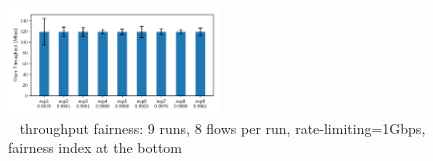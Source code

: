 \begin{figure}[!t]
\centering
\includegraphics[width=0.5\textwidth]{rate_limiter/raw_data/spring_fairness/figure.pdf}
\caption{~\spring{} throughput fairness: 9 runs, 8 flows per run, rate-limiting=1Gbps, fairness index at the bottom}
\label{fig:spring:fairness}
\end{figure}
